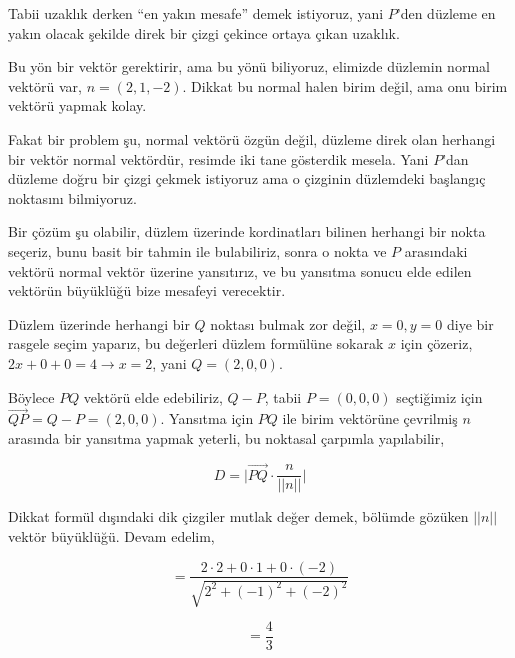 \documentclass[12pt,fleqn]{article}\usepackage{../../common}
\begin{document}
Tabii uzaklık derken ``en yakın mesafe'' demek istiyoruz, yani $P$'den düzleme
en yakın olacak şekilde direk bir çizgi çekince ortaya çıkan uzaklık.

Bu yön bir vektör gerektirir, ama bu yönü biliyoruz, elimizde düzlemin normal
vektörü var, $n = (2,1,-2)$. Dikkat bu normal halen birim değil, ama onu birim
vektörü yapmak kolay.

Fakat bir problem şu, normal vektörü özgün değil, düzleme direk olan herhangi
bir vektör normal vektördür, resimde iki tane gösterdik mesela. Yani $P$'dan
düzleme doğru bir çizgi çekmek istiyoruz ama o çizginin düzlemdeki başlangıç
noktasını bilmiyoruz. 

Bir çözüm şu olabilir, düzlem üzerinde kordinatları bilinen herhangi bir nokta
seçeriz, bunu basit bir tahmin ile bulabiliriz, sonra o nokta ve $P$ arasındaki
vektörü normal vektör üzerine yansıtırız, ve bu yansıtma sonucu elde edilen
vektörün büyüklüğü bize mesafeyi verecektir.

Düzlem üzerinde herhangi bir $Q$ noktası bulmak zor değil, $x=0,y=0$ diye bir
rasgele seçim yaparız, bu değerleri düzlem formülüne sokarak $x$ için çözeriz,
$2x + 0 + 0 = 4 \to x = 2$, yani $Q = (2,0,0)$.

Böylece $PQ$ vektörü elde edebiliriz, $Q - P$, tabii $P = (0,0,0)$ seçtiğimiz
için $\vec{QP} = Q - P = (2,0,0)$. Yansıtma için $PQ$ ile birim vektörüne
çevrilmiş $n$ arasında bir yansıtma yapmak yeterli, bu noktasal çarpımla
yapılabilir,

$$
D =  \bigg| \vec{PQ} \cdot \frac{n}{||n||} \bigg|
$$

Dikkat formül dışındaki dik çizgiler mutlak değer demek, bölümde gözüken $||n||$
vektör büyüklüğü. Devam edelim,

$$
= \frac{2 \cdot 2 + 0 \cdot 1 + 0 \cdot (-2) }{ \sqrt{2^2 + (-1)^2 + (-2)^2} } 
$$

$$
= \frac{4}{3}
$$
\end{document}
